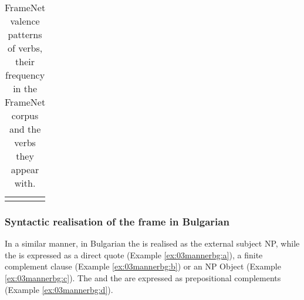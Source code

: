 \documentclass[output=paper,colorlinks,citecolor=brown]{langscibook}
\begin{document}
\begin{table}
\begin{tabularx}{\textwidth}{lrQ}
\lspbottomrule
\end{tabularx}
\caption{FrameNet valence patterns of  verbs, their frequency in the FrameNet corpus and the verbs they appear with.}
\label{tbl:communication-manner-valence}
\end{table} 


\subsubsection{Syntactic realisation of the  frame in Bulgarian}

In a similar manner, in Bulgarian the  is realised as the external subject NP, while the  is expressed as a direct quote (Example \ref{ex:03mannerbg:a}), a finite complement clause (Example \ref{ex:03mannerbg:b}) or an NP Object (Example \ref{ex:03mannerbg:c}). The  and the  are expressed as prepositional complements (Example \ref{ex:03mannerbg:d}).
\end{document}
